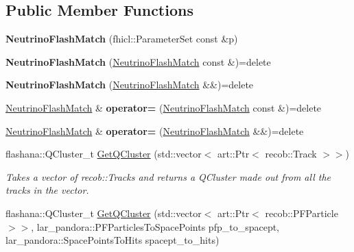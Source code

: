 \subsection*{Public Member Functions}
\begin{DoxyCompactItemize}
\item 
\hypertarget{classNeutrinoFlashMatch_a2c3aa4e9461e3f31e9d198ba5d481cd6}{{\bfseries Neutrino\-Flash\-Match} (fhicl\-::\-Parameter\-Set const \&p)}\label{classNeutrinoFlashMatch_a2c3aa4e9461e3f31e9d198ba5d481cd6}

\item 
\hypertarget{classNeutrinoFlashMatch_af69b13e9ca68fff69d3e9d8280d9c436}{{\bfseries Neutrino\-Flash\-Match} (\hyperlink{classNeutrinoFlashMatch}{Neutrino\-Flash\-Match} const \&)=delete}\label{classNeutrinoFlashMatch_af69b13e9ca68fff69d3e9d8280d9c436}

\item 
\hypertarget{classNeutrinoFlashMatch_a5e58dc2e3e587db95317151b1acd6518}{{\bfseries Neutrino\-Flash\-Match} (\hyperlink{classNeutrinoFlashMatch}{Neutrino\-Flash\-Match} \&\&)=delete}\label{classNeutrinoFlashMatch_a5e58dc2e3e587db95317151b1acd6518}

\item 
\hypertarget{classNeutrinoFlashMatch_afd7be5fa45629eca0b992c8d31adc747}{\hyperlink{classNeutrinoFlashMatch}{Neutrino\-Flash\-Match} \& {\bfseries operator=} (\hyperlink{classNeutrinoFlashMatch}{Neutrino\-Flash\-Match} const \&)=delete}\label{classNeutrinoFlashMatch_afd7be5fa45629eca0b992c8d31adc747}

\item 
\hypertarget{classNeutrinoFlashMatch_ac1b32943963d8f7f50339410dbdcfd5c}{\hyperlink{classNeutrinoFlashMatch}{Neutrino\-Flash\-Match} \& {\bfseries operator=} (\hyperlink{classNeutrinoFlashMatch}{Neutrino\-Flash\-Match} \&\&)=delete}\label{classNeutrinoFlashMatch_ac1b32943963d8f7f50339410dbdcfd5c}

\item 
\hypertarget{classNeutrinoFlashMatch_aa511b92472bb70883c5a666293be1da3}{flashana\-::\-Q\-Cluster\-\_\-t \hyperlink{classNeutrinoFlashMatch_aa511b92472bb70883c5a666293be1da3}{Get\-Q\-Cluster} (std\-::vector$<$ art\-::\-Ptr$<$ recob\-::\-Track $>$$>$)}\label{classNeutrinoFlashMatch_aa511b92472bb70883c5a666293be1da3}

\begin{DoxyCompactList}\small\item\em Takes a vector of recob\-::\-Tracks and returns a Q\-Cluster made out from all the tracks in the vector. \end{DoxyCompactList}\item 
\hypertarget{classNeutrinoFlashMatch_a93132a117b6ea907ba95bba4a6af6107}{flashana\-::\-Q\-Cluster\-\_\-t \hyperlink{classNeutrinoFlashMatch_a93132a117b6ea907ba95bba4a6af6107}{Get\-Q\-Cluster} (std\-::vector$<$ art\-::\-Ptr$<$ recob\-::\-P\-F\-Particle $>$$>$, lar\-\_\-pandora\-::\-P\-F\-Particles\-To\-Space\-Points pfp\-\_\-to\-\_\-spacept, lar\-\_\-pandora\-::\-Space\-Points\-To\-Hits spacept\-\_\-to\-\_\-hits)}\label{classNeutrinoFlashMatch_a93132a117b6ea907ba95bba4a6af6107}


\end{DoxyCompactItemize}
